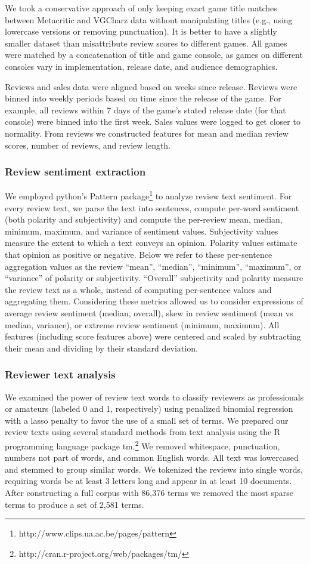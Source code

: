 \documentclass[letterpaper]{article}
\begin{document}
We took a conservative approach of only keeping exact game title matches between Metacritic and VGCharz data without manipulating titles (e.g., using lowercase versions or removing punctuation). It is better to have a slightly smaller dataset than misattribute review scores to different games. All games were matched by a concatenation of title and game console, as games on different consoles vary in implementation, release date, and audience demographics. 

Reviews and sales data were aligned based on weeks since release. Reviews were binned into weekly periods based on time since the release of the game. For example, all reviews within 7 days of the game's stated release date (for that console) were binned into the first week. Sales values were logged to get closer to normality. From reviews we constructed features for mean and median review scores, number of reviews, and review length.

\subsubsection{Review sentiment extraction}
We employed python's Pattern package\footnote{http://www.clips.ua.ac.be/pages/pattern} to analyze review text sentiment. For every review text, we parse the text into sentences, compute per-word sentiment (both polarity and subjectivity) and compute the per-review mean, median, minimum, maximum, and variance of sentiment values. Subjectivity values measure the extent to which a text conveys an opinion. Polarity values estimate that opinion as positive or negative. Below we refer to these per-sentence aggregation values as the review ``mean'', ``median'', ``minimum'', ``maximum'', or ``variance'' of polarity or subjectivity. ``Overall'' subjectivity and polarity measure the review text as a whole, instead of computing per-sentence values and aggregating them. Considering these metrics allowed us to consider expressions of average review sentiment (median, overall), skew in review sentiment (mean vs median, variance), or extreme review sentiment (minimum, maximum). All features (including score features above) were centered and scaled by subtracting their mean and dividing by their standard deviation.

\subsubsection{Reviewer text analysis}
We examined the power of review text words to classify reviewers as professionals or amateurs (labeled 0 and 1, respectively) using penalized binomial regression with a lasso penalty to favor the use of a small set of terms.
We prepared our review texts using several standard methods from text analysis using the R programming language package tm.\footnote{http://cran.r-project.org/web/packages/tm/} We removed whitespace, punctuation, numbers not part of words, and common English words. All text was lowercased and stemmed to group similar words. We tokenized the reviews into single words, requiring words be at least 3 letters long and appear in at least 10 documents. After constructing a full corpus with 86,376 terms we removed the most sparse terms to produce a set of 2,581 terms.
\end{document}
